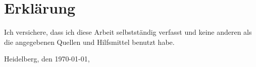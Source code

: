 \section*{Erkl\"{a}rung}

Ich versichere, dass ich diese Arbeit selbstst\"{a}ndig verfasst und keine anderen als die angegebenen Quellen und Hilfsmittel benutzt habe.

Heidelberg, den {\today},

